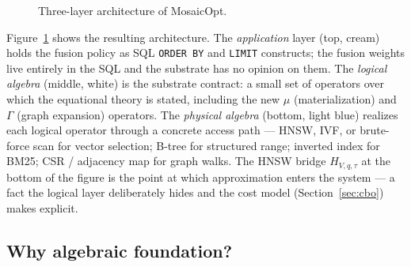 \documentclass[sigconf,nonacm,review]{acmart}
\theoremstyle{plain}
\theoremstyle{definition}
\theoremstyle{remark}
\begin{document}
\begin{figure}[t]
{%
  }
  \caption{Three-layer architecture of MosaicOpt.}
  \label{fig:threelayer}
\end{figure}

Figure~\ref{fig:threelayer} shows the resulting architecture.
The \emph{application} layer (top, cream) holds the fusion policy
as SQL \texttt{ORDER BY} and \texttt{LIMIT} constructs; the fusion
weights live entirely in the SQL and the substrate has no opinion
on them. The \emph{logical algebra} (middle, white) is the
substrate contract: a small set of operators over which the
equational theory is stated, including the new $\mu$
(materialization) and $\Gamma$ (graph expansion) operators. The
\emph{physical algebra} (bottom, light blue) realizes each logical
operator through a concrete access path --- HNSW, IVF, or
brute-force scan for vector selection; B-tree for structured
range; inverted index for BM25; CSR / adjacency map for graph
walks. The HNSW bridge $H_{V,q,\tau}$ at the bottom of the figure
is the point at which approximation enters the system --- a fact
the logical layer deliberately hides and the cost model
(Section~\ref{sec:cbo}) makes
explicit.

\subsection{Why algebraic foundation?}\label{sec:intro:algebra}
\end{document}
